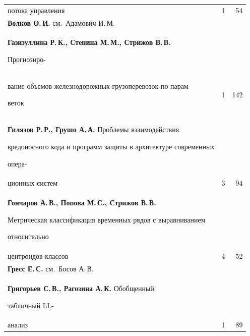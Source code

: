 {\begin{tabular}{p{317.5pt}rr}
\\[-12pt]


\hspace*{21pt}потока управления&1&54\\


\textbf{Волков О.\,И.} см.\ Адамович И.\,М.&&\\


\textbf{Газизуллина Р.\,К., Стенина М.\,М., Стрижов В.\,В.}


Прогнозиро-\linebreak


\\[-12pt]


\hspace*{21pt}вание объемов железнодорожных грузоперевозок по парам


веток&1&142\\


\hangindent=21pt\noindent\textbf{Гилязов Р.\,Р., Грушо А.\,А.} Проблемы взаимодействия


вредоносного кода и программ защиты в архитектуре современных


опера-\linebreak


\\[-12pt]


\hspace*{21pt}ционных систем&3&94\\


\hangindent=21pt\noindent\textbf{Гончаров А.\,В., Попова М.\,С., Стрижов В.\,В.}


Метрическая классификация временных рядов с выравниванием


относительно\linebreak


\\[-12pt]


\hspace*{21pt}центроидов классов&4&52\\


\textbf{Гресс Е.\,С.} см.\ Босов А.\,В.&&\\


\textbf{Григорьев С.\,В., Рагозина А.\,К.} Обобщенный


табличный LL-\linebreak


\\[-12pt]


\hspace*{21pt}анализ&1&89\\


\end{tabular}


}


